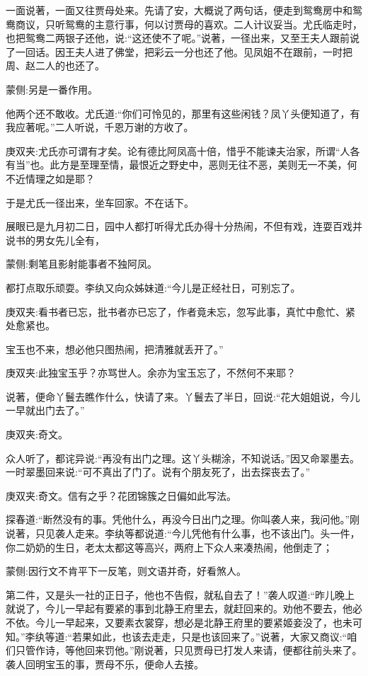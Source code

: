\begin{parag}
    一面说著，一面又往贾母处来。先请了安，大概说了两句话，便走到鸳鸯房中和鸳鸯商议，只听鸳鸯的主意行事，何以讨贾母的喜欢。二人计议妥当。尤氏临走时，也把鸳鸯二两银子还他，说:“这还使不了呢。”说著，一径出来，又至王夫人跟前说了一回话。因王夫人进了佛堂，把彩云一分也还了他。见凤姐不在跟前，一时把周、赵二人的也还了。\begin{note}蒙侧:另是一番作用。\end{note}他两个还不敢收。尤氏道:“你们可怜见的，那里有这些闲钱？凤丫头便知道了，有我应著呢。”二人听说，千恩万谢的方收了。\begin{note}庚双夹:尤氏亦可谓有才矣。论有德比阿凤高十倍，惜乎不能谏夫治家，所谓“人各有当”也。此方是至理至情，最恨近之野史中，恶则无往不恶，美则无一不美，何不近情理之如是耶？\end{note}于是尤氏一径出来，坐车回家。不在话下。
\end{parag}


\begin{parag}
    展眼已是九月初二日，园中人都打听得尤氏办得十分热闹，不但有戏，连耍百戏并说书的男女先儿全有，\begin{note}蒙侧:剩笔且影射能事者不独阿凤。\end{note}都打点取乐顽耍。李纨又向众姊妹道:“今儿是正经社日，可别忘了。\begin{note}庚双夹:看书者已忘，批书者亦已忘了，作者竟未忘，忽写此事，真忙中愈忙、紧处愈紧也。\end{note}宝玉也不来，想必他只图热闹，把清雅就丢开了。”\begin{note}庚双夹:此独宝玉乎？亦骂世人。余亦为宝玉忘了，不然何不来耶？\end{note}说著，便命丫鬟去瞧作什么，快请了来。丫鬟去了半日，回说:“花大姐姐说，今儿一早就出门去了。”\begin{note}庚双夹:奇文。\end{note}众人听了，都诧异说:“再没有出门之理。这丫头糊涂，不知说话。”因又命翠墨去。一时翠墨回来说:“可不真出了门了。说有个朋友死了，出去探丧去了。”\begin{note}庚双夹:奇文。信有之乎？花团锦簇之日偏如此写法。\end{note}探春道:“断然没有的事。凭他什么，再没今日出门之理。你叫袭人来，我问他。”刚说著，只见袭人走来。李纨等都说道:“今儿凭他有什么事，也不该出门。头一件，你二奶奶的生日，老太太都这等高兴，两府上下众人来凑热闹，他倒走了；\begin{note}蒙侧:因行文不肯平下一反笔，则文语并奇，好看煞人。\end{note}第二件，又是头一社的正日子，他也不告假，就私自去了！”袭人叹道:“昨儿晚上就说了，今儿一早起有要紧的事到北静王府里去，就赶回来的。劝他不要去，他必不依。今儿一早起来，又要素衣裳穿，想必是北静王府里的要紧姬妾没了，也未可知。”李纨等道:“若果如此，也该去走走，只是也该回来了。”说著，大家又商议:“咱们只管作诗，等他回来罚他。”刚说著，只见贾母已打发人来请，便都往前头来了。袭人回明宝玉的事，贾母不乐，便命人去接。
\end{parag}


